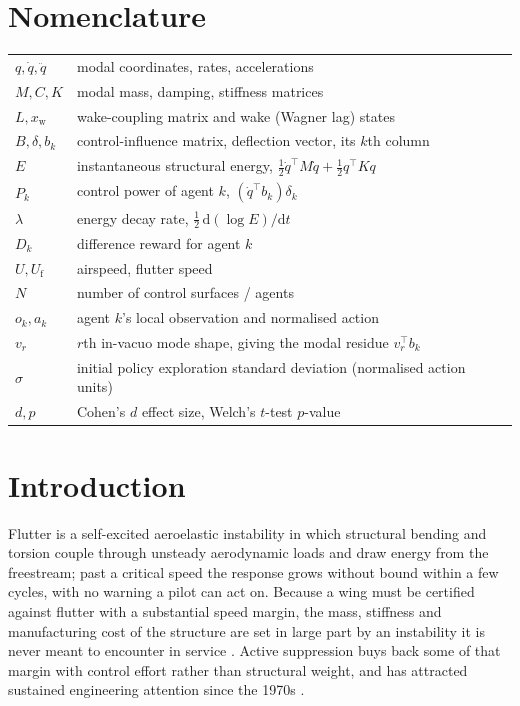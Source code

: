 \documentclass[journal]{new-aiaa}
\newcommand{\Uf}{U_{\mathrm{f}}}
\begin{document}
\section*{Nomenclature}
\begin{tabular}{@{}lp{5in}@{}}
$q,\dot q,\ddot q$ & modal coordinates, rates, accelerations \\
$M,C,K$ & modal mass, damping, stiffness matrices \\
$L,x_{\mathrm{w}}$ & wake-coupling matrix and wake (Wagner lag) states \\
$B,\delta,b_k$ & control-influence matrix, deflection vector, its $k$th column \\
$E$ & instantaneous structural energy, $\tfrac12\dot q^\top M\dot q+\tfrac12 q^\top Kq$ \\
$P_k$ & control power of agent $k$, $(\dot q^\top b_k)\delta_k$ \\
$\lambda$ & energy decay rate, $\tfrac12\,\mathrm{d}(\log E)/\mathrm{d}t$ \\
$D_k$ & difference reward for agent $k$ \\
$U,\Uf$ & airspeed, flutter speed \\
$N$ & number of control surfaces / agents \\
$o_k,a_k$ & agent $k$'s local observation and normalised action \\
$v_r$ & $r$th in-vacuo mode shape, giving the modal residue $v_r^\top b_k$ \\
$\sigma$ & initial policy exploration standard deviation (normalised action units) \\
$d,p$ & Cohen's $d$ effect size, Welch's $t$-test $p$-value \\
\end{tabular}

\section{Introduction}
\label{sec:intro}

Flutter is a self-excited aeroelastic instability in which structural
bending and torsion couple through unsteady aerodynamic loads and draw
energy from the freestream; past a critical speed the response grows
without bound within a few cycles, with no warning a pilot can act on.
Because a wing must be certified against flutter with a substantial speed
margin, the mass, stiffness and manufacturing cost of the structure are set
in large part by an instability it is never meant to encounter in service
\cite{livne2018flutter, mukhopadhyay2003historical}. Active suppression buys
back some of that margin with control effort rather than structural weight,
and has attracted sustained engineering attention since the 1970s
\cite{karpel1982design,waszak2001robust,block1998applied}.
\end{document}
